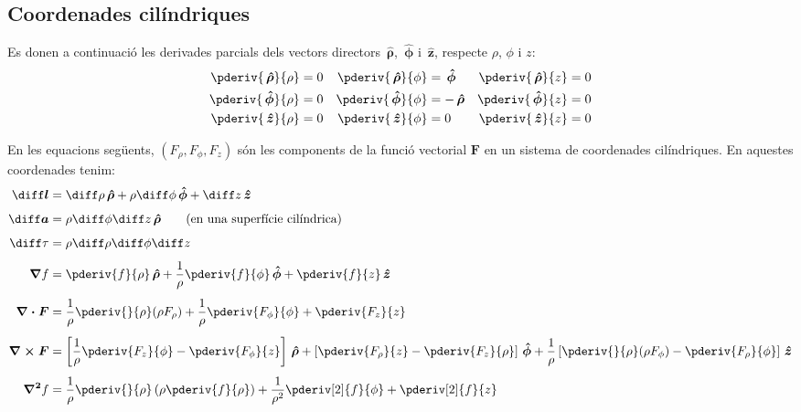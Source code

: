 \documentclass[catalan,a4paper,twoside,11pt]{article}
\begin{document}
\subsection{Coordenades cilíndriques}

\renewcommand{\va}{\ensuremath{\,\boldsymbol{\hat{\rho}}}}
\renewcommand{\vb}{\ensuremath{\,\boldsymbol{\hat{\phi}}}}
\renewcommand{\vc}{\ensuremath{\,\boldsymbol{\hat{z}}}}

Es donen a continuació les derivades parcials dels vectors directors $\va$, $\vb$ i $\vc$, respecte $\rho$, $\phi$ i $z$:
\begin{subequations}
\begin{align}
   \pderiv{\va}{\rho} &= 0 & \pderiv{\va}{\phi} &= \vb  & \pderiv{\va}{z} &= 0 \\
   \pderiv{\vb}{\rho} &= 0 & \pderiv{\vb}{\phi} &= -\va & \pderiv{\vb}{z} &= 0 \\
   \pderiv{\vc}{\rho} &= 0 & \pderiv{\vc}{\phi} &= 0    & \pderiv{\vc}{z} &= 0
\end{align}
\end{subequations}

En les equacions següents, $(F_\rho,F_\phi,F_z)$  són les
components de la funció vectorial   $\boldsymbol{F}$ en un sistema de
coordenades cilíndriques. En aquestes coordenades tenim:
\begin{align}
    \boldsymbol{\diff l} &= \diff \rho \va + \rho\diff \phi \vb + \diff z \vc\\[1ex]
    \boldsymbol{\diff a} &= \rho\diff \phi \diff z \va\qquad\text{(en una superfície cilíndrica)}\\[1ex]
    \diff\tau &= \rho \diff \rho \diff \phi \diff z\\[1ex]
    \boldsymbol{\nabla}f &= \pderiv{f}{\rho}\va + \frac{1}{\rho}\pderiv{f}{\phi}\vb
    + \pderiv{f}{z}\vc\\[1ex]
    \boldsymbol{\nabla\cdot F} &= \frac{1}{\rho}\pderiv{}{\rho}(\rho F_\rho) +
    \frac{1}{\rho}\pderiv{F_\phi}{\phi}+ \pderiv{F_z}{z}\\[1ex]
    \boldsymbol{\nabla\times F} &= \left[\frac{1}{\rho}\pderiv{F_z}{\phi}-
    \pderiv{F_\phi}{z}\right]\va +
    \left[\pderiv{F_\rho}{z}-\pderiv{F_z}{\rho}\right]\vb +
    \frac{1}{\rho}\left[\pderiv{}{\rho}(\rho F_\phi)-\pderiv{F_\rho}{\phi}\right]\vc\\[1ex]
    \boldsymbol{\nabla^2}f &= \frac{1}{\rho}\pderiv{}{\rho}\left(\rho\pderiv{f}{\rho}
    \right)
    + \frac{1}{\rho^2}\pderiv[2]{f}{\phi}+ \pderiv[2]{f}{z}
\end{align}
\end{document}
